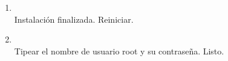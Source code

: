 \documentclass[11pt]{article}
\begin{document}
\begin{enumerate}
		    \item 
		    	\begin{minipage}[t]{\linewidth}
			        \raggedright
			        \medskip
			        \\Instalación finalizada. Reiniciar. 
		        \end{minipage}	

		   	\item 
		   		\begin{minipage}[t]{\linewidth}
			        \raggedright
			        \medskip
			        \\Tipear el nombre de usuario root y su contraseña. Listo. 
		        \end{minipage}			   
		\end{enumerate}
\end{document}
